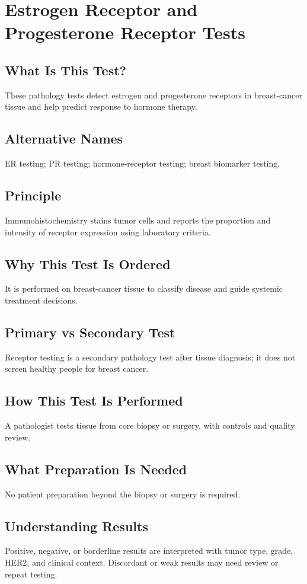 \chapter{Estrogen Receptor and Progesterone Receptor Tests}
\section*{What Is This Test?} These pathology tests detect estrogen and progesterone receptors in breast-cancer tissue and help predict response to hormone therapy.
\section*{Alternative Names} ER testing; PR testing; hormone-receptor testing; breast biomarker testing.
\section*{Principle} Immunohistochemistry stains tumor cells and reports the proportion and intensity of receptor expression using laboratory criteria.
\section*{Why This Test Is Ordered} It is performed on breast-cancer tissue to classify disease and guide systemic treatment decisions.
\section*{Primary vs Secondary Test} Receptor testing is a secondary pathology test after tissue diagnosis; it does not screen healthy people for breast cancer.
\section*{How This Test Is Performed} A pathologist tests tissue from core biopsy or surgery, with controls and quality review.
\section*{What Preparation Is Needed} No patient preparation beyond the biopsy or surgery is required.
\section*{Understanding Results} Positive, negative, or borderline results are interpreted with tumor type, grade, HER2, and clinical context. Discordant or weak results may need review or repeat testing.
